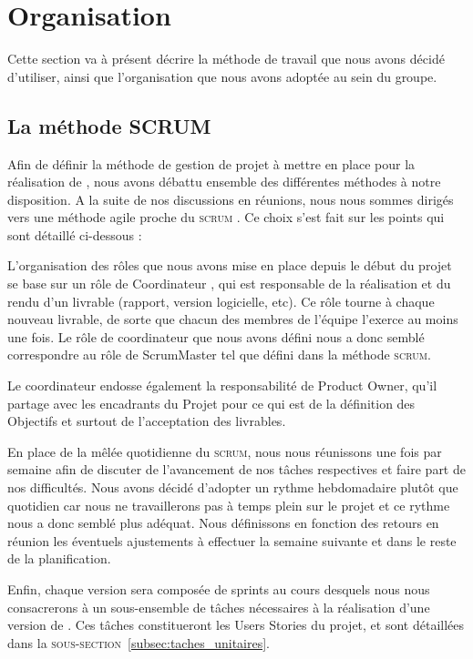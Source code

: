 \section{Organisation}
    \label{sec:orga}
    Cette section va à présent décrire la méthode de travail que nous avons décidé d'utiliser, ainsi que l'organisation que nous avons adoptée au sein du groupe.

    \subsection{La méthode SCRUM}
    \label{subsec:scrum}
        Afin de définir la méthode de gestion de projet à mettre en place pour la réalisation de \glasir{}, nous avons débattu ensemble des différentes méthodes à notre disposition. A la suite de     nos discussions en réunions, nous nous sommes dirigés vers une méthode agile proche du \og \textsc{scrum} \fg{}. Ce choix s'est fait sur les points qui sont détaillé ci-dessous :

        L'organisation des rôles que nous avons mise en place depuis le début du projet se base sur un rôle de \og Coordinateur \fg{}, qui est responsable de la réalisation et du rendu d'un livrable (rapport, version logicielle, etc). Ce rôle tourne à chaque nouveau livrable, de sorte que chacun des membres de l'équipe l'exerce au moins une fois. Le rôle de coordinateur que nous avons défini nous a donc semblé correspondre au rôle de ScrumMaster tel que défini dans la méthode \textsc{scrum}.

        Le coordinateur endosse également la responsabilité de Product Owner, qu'il partage avec les encadrants du Projet pour ce qui est de la définition des Objectifs et surtout de l'acceptation des livrables.

        En place de la mêlée quotidienne du \textsc{scrum}, nous nous réunissons une fois par semaine afin de discuter de l'avancement de nos tâches respectives et faire part de nos difficultés. Nous avons décidé d'adopter un rythme hebdomadaire plutôt que quotidien car nous ne travaillerons pas à temps plein sur le projet et ce rythme nous a donc semblé plus adéquat. Nous définissons en fonction des retours en réunion les éventuels ajustements à effectuer la semaine suivante et dans le reste de la planification.

        Enfin, chaque version sera composée de sprints au cours desquels nous nous consacrerons à un sous-ensemble de tâches nécessaires à la réalisation d'une version de \glasir{}. Ces tâches constitueront les Users Stories du projet, et sont détaillées dans la \textsc{sous-section}~\ref{subsec:taches_unitaires}.  
    

